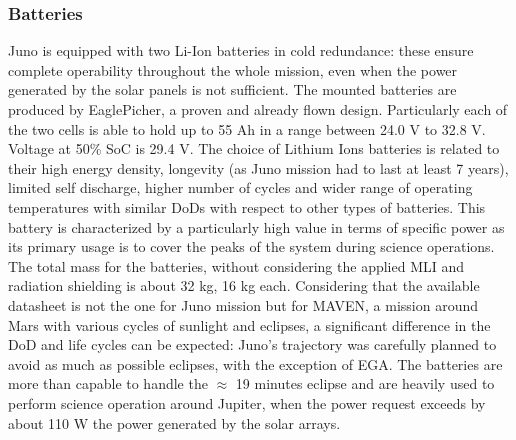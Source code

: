 \subsubsection{Batteries}
\label{subsubsec:Batteries}
Juno is equipped with two Li-Ion batteries in cold redundance: these ensure complete operability throughout the whole mission, even when the power generated by the solar panels is not sufficient.
The mounted batteries are produced by EaglePicher, a proven and already flown design.\cite{batteries_juno} Particularly each of the two cells is able to hold up to 55 Ah in a range between 24.0 V to 32.8 V. Voltage at 50\% SoC is 29.4 V.\cite{solar_panels_coef} The choice of Lithium Ions batteries is related to their high energy density, longevity (as Juno mission had to last at least 7 years), limited self discharge, higher number of cycles and wider range of operating temperatures with similar DoDs with respect to other types of batteries.
This battery is characterized by a particularly high value in terms of specific power as its primary usage is to cover the peaks of the system during science operations.
The total mass for the batteries, without considering the applied MLI and radiation shielding is about 32 kg, 16 kg each. Considering that the available datasheet \cite{batteries_juno} is not the one for Juno mission but for MAVEN, a mission around Mars with various cycles of sunlight and eclipses, a significant difference in the DoD and life cycles can be expected: Juno's trajectory was carefully planned to avoid as much as possible eclipses, with the exception of EGA. The batteries are more than capable to handle the $\approx$ 19 minutes eclipse \cite{juno_inner} and are heavily used to perform science operation around Jupiter, when the power request exceeds by about 110 W the power generated by the solar arrays.



